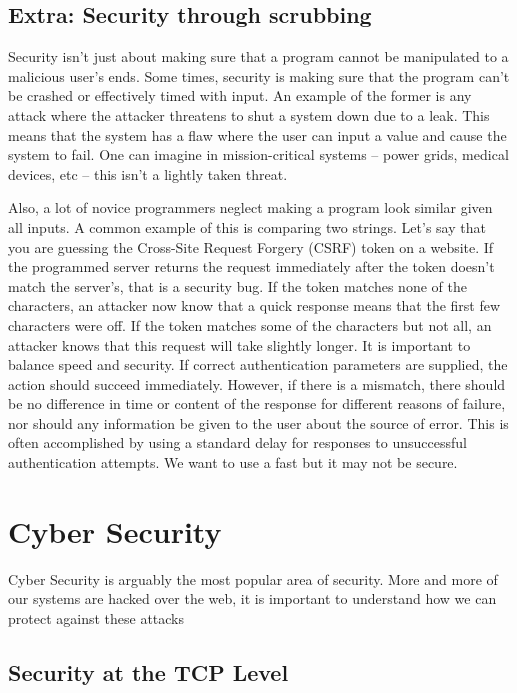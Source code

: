 \subsection{Extra: Security through scrubbing}

Security isn't just about making sure that a program cannot be manipulated to a malicious user's ends.
Some times, security is making sure that the program can't be crashed or effectively timed with input.
An example of the former is any attack where the attacker threatens to shut a system down due to a leak.
This means that the system has a flaw where the user can input a value and cause the system to fail.
One can imagine in mission-critical systems -- power grids, medical devices, etc -- this isn't a lightly taken threat.

Also, a lot of novice programmers neglect making a program look similar given all inputs.
A common example of this is comparing two strings.
Let's say that you are guessing the Cross-Site Request Forgery (CSRF) token on a website.
If the programmed server returns the request immediately after the token doesn't match the server's, that is a security bug.
If the token matches none of the characters, an attacker now know that a quick response means that the first few characters were off.
If the token matches some of the characters but not all, an attacker knows that this request will take slightly longer.
It is important to balance speed and security.
If correct authentication parameters are supplied, the action should succeed immediately.
However, if there is a mismatch, there should be no difference in time or content of the response for different reasons of failure, nor should any information be given to the user about the source of error.
This is often accomplished by using a standard delay for responses to unsuccessful authentication attempts.
We want to use a fast  but it may not be secure.

\section{Cyber Security}

Cyber Security is arguably the most popular area of security.
More and more of our systems are hacked over the web, it is important to understand how we can protect against these attacks

\subsection{Security at the TCP Level}

